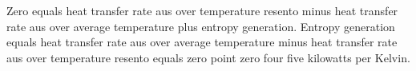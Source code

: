 Zero equals heat transfer rate aus over temperature resento minus heat transfer rate aus over average temperature plus entropy generation.  
Entropy generation equals heat transfer rate aus over average temperature minus heat transfer rate aus over temperature resento equals zero point zero four five kilowatts per Kelvin.